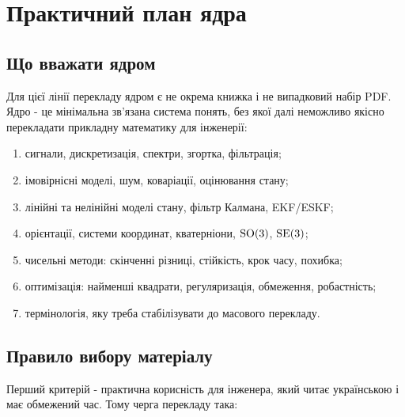 \chapter{Практичний план ядра}

\section{Що вважати ядром}

Для цієї лінії перекладу ядром є не окрема книжка і не випадковий набір PDF. Ядро - це мінімальна зв'язана система понять, без якої далі неможливо якісно перекладати прикладну математику для інженерії:

\begin{enumerate}[label=\arabic*.]
  \item сигнали, дискретизація, спектри, згортка, фільтрація;
  \item імовірнісні моделі, шум, коваріації, оцінювання стану;
  \item лінійні та нелінійні моделі стану, фільтр Калмана, EKF/ESKF;
  \item орієнтації, системи координат, кватерніони, $\mathrm{SO}(3)$, $\mathrm{SE}(3)$;
  \item чисельні методи: скінченні різниці, стійкість, крок часу, похибка;
  \item оптимізація: найменші квадрати, регуляризація, обмеження, робастність;
  \item термінологія, яку треба стабілізувати до масового перекладу.
\end{enumerate}


\section{Правило вибору матеріалу}

Перший критерій - практична корисність для інженера, який читає українською і має обмежений час. Тому черга перекладу така:


